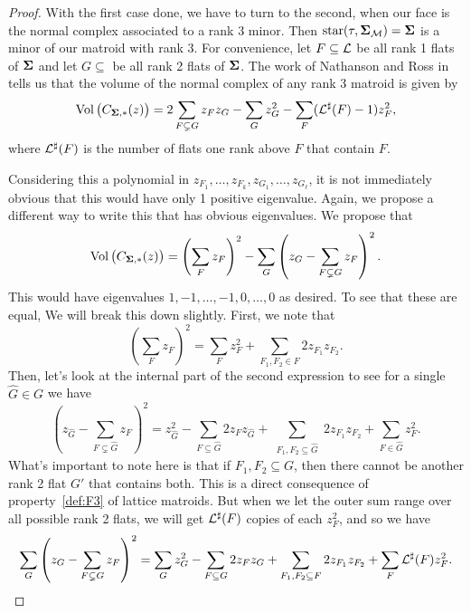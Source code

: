 \documentclass[12pt,oneside]{../../sfsuthesis}
\begin{document}
\begin{proof}
    With the first case done, we have to turn to the second, when our face is the normal complex associated to a rank 3 minor.
    Then \( \operatorname{star}(\tau, \bm{\Sigma}_{\mathcal{M}}) = \bm{\Sigma} \) is a minor of our matroid with rank 3.
    For convenience, let \( F \subseteq \mathcal{L} \) be all rank 1 flats of \( \bm{\Sigma} \) and let \( G \subseteq \) be all rank 2 flats of \( \bm{\Sigma} \).
    The work of Nathanson and Ross in \cite{nathansonTropicalFansNormal2021} tells us that the volume of the normal complex of any rank 3 matroid is given by
    \[
        \operatorname{Vol}\big(C_{\bm{\Sigma}, \ast}(z)\big) = 2\sum_{F \subsetneq G} z_F z_G - \sum_{G} z_G^2 - \sum_{F}(\mathcal{L}^\sharp(F) - 1)z_F^2,
    \]
    where \( \mathcal{L}^\sharp(F) \) is the number of flats one rank above \( F \) that contain \( F \).

    Considering this a polynomial in \( z_{F_1}, \dots, z_{F_k}, z_{G_1}, \dots, z_{G_\ell} \), it is not immediately obvious that this would have only 1 positive eigenvalue.
    Again, we propose a different way to write this that has obvious eigenvalues.
    We propose that
    \[
        \operatorname{Vol}\big(C_{\bm{\Sigma}, \ast}(z)\big) = \left( \sum_F z_F\right)^2 - \sum_G \left( z_G - \sum_{F \subsetneq G} z_F\right)^2.
    \]
    This would have eigenvalues \( 1, -1, \dots, -1, 0, \dots, 0 \) as desired.
    To see that these are equal, We will break this down slightly.
    First, we note that
    \begin{equation}
        \left( \sum_F z_F\right)^2 = \sum_F z_F^2 + \sum_{F_1, F_2 \in F} 2z_{F_1}z_{F_2}.
    \end{equation}
    Then, let's look at the internal part of the second expression to see for a single \( \hat{G} \in G \) we have
    \begin{equation}
        \left( z_{\hat{G}} - \sum_{F \subsetneq {\hat{G}}} z_F \right)^2 = z_{\hat{G}}^2 - \sum_{F \subseteq \hat{G}}2 z_F z_{\hat{G}} + \sum_{\substack{F_1,F_2 \subseteq \hat{G}}}2z_{F_1} z_{F_2} + \sum_{F \in \hat{G}} z_F^2.
    \end{equation}
    What's important to note here is that if \( F_1, F_2 \subseteq G \), then there cannot be another rank 2 flat \( G' \) that contains both.
    This is a direct consequence of property~\ref{def:F3} of lattice matroids.
    But when we let the outer sum range over all possible rank 2 flats, we will get \( \mathcal{L}^\sharp(F) \) copies of each \( z_F^2 \), and so we have
    \begin{equation}
        \sum_G \left( z_G - \sum_{F \subsetneq G} z_F\right)^2 =
        \sum_{G}z_G^2
        - \sum_{F \subseteq G}2 z_F z_{G}
        + \sum_{\substack{F_1,F_2 \subseteq F}}2z_{F_1} z_{F_2}
        + \sum_{F} \mathcal{L}^\sharp(F)z_F^2.
    \end{equation}


\end{proof}
\end{document}

